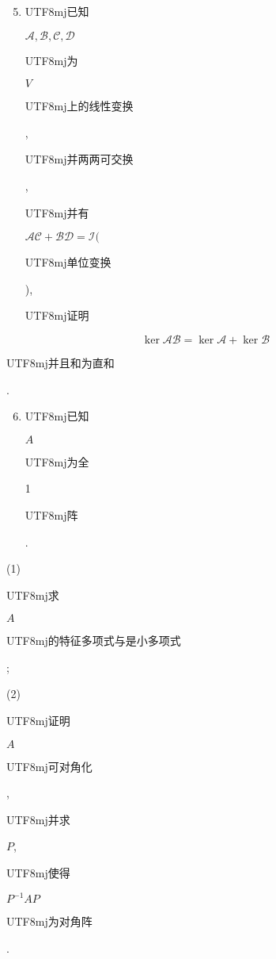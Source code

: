 \documentclass[10pt]{article}
\begin{document}
\begin{enumerate}
  \setcounter{enumi}{4}
  \item \begin{CJK}{UTF8}{mj}已知\end{CJK} $\mathscr{A}, \mathscr{B}, \mathscr{C}, \mathscr{D}$ \begin{CJK}{UTF8}{mj}为\end{CJK} $V$ \begin{CJK}{UTF8}{mj}上的线性变换\end{CJK}, \begin{CJK}{UTF8}{mj}并两两可交换\end{CJK}, \begin{CJK}{UTF8}{mj}并有\end{CJK} $\mathscr{A} \mathscr{C}+\mathscr{B} \mathscr{D}=\mathscr{I}($ \begin{CJK}{UTF8}{mj}单位变换\end{CJK}), \begin{CJK}{UTF8}{mj}证明\end{CJK}
\end{enumerate}
$$
\operatorname{ker} \mathscr{A} \mathscr{B}=\operatorname{ker} \mathscr{A}+\operatorname{ker} \mathscr{B}
$$
\begin{CJK}{UTF8}{mj}并且和为直和\end{CJK}.

\begin{enumerate}
  \setcounter{enumi}{5}
  \item \begin{CJK}{UTF8}{mj}已知\end{CJK} $A$ \begin{CJK}{UTF8}{mj}为全\end{CJK} 1 \begin{CJK}{UTF8}{mj}阵\end{CJK}.
\end{enumerate}
(1) \begin{CJK}{UTF8}{mj}求\end{CJK} $A$ \begin{CJK}{UTF8}{mj}的特征多项式与是小多项式\end{CJK};

(2) \begin{CJK}{UTF8}{mj}证明\end{CJK} $A$ \begin{CJK}{UTF8}{mj}可对角化\end{CJK}, \begin{CJK}{UTF8}{mj}并求\end{CJK} $P$, \begin{CJK}{UTF8}{mj}使得\end{CJK} $P^{-1} A P$ \begin{CJK}{UTF8}{mj}为对角阵\end{CJK}.
\end{document}
